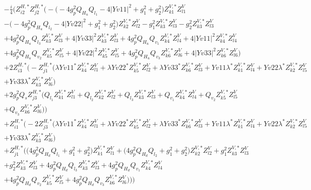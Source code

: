 \begin{align} 
 &-\frac{i}{4} \Big(Z^{H,*}_{i 2} Z^{H,*}_{j 2} \Big(- \Big(-4 g_{p}^{2} Q_{H_u} Q_{l_1}  -4 |Yv11|^2  + g_{1}^{2} + g_{2}^{2}\Big)Z^{V,*}_{k 1} Z_{{l 1}}^{V} \nonumber \\ 
 &- \Big(-4 g_{p}^{2} Q_{H_u} Q_{l_2}  -4 |Yv22|^2  + g_{1}^{2} + g_{2}^{2}\Big)Z^{V,*}_{k 2} Z_{{l 2}}^{V} - g_{1}^{2} Z^{V,*}_{k 3} Z_{{l 3}}^{V} - g_{2}^{2} Z^{V,*}_{k 3} Z_{{l 3}}^{V} \nonumber \\ 
 &+4 g_{p}^{2} Q_{H_u} Q_{l_3} Z^{V,*}_{k 3} Z_{{l 3}}^{V} +4 |Yv33|^2 Z^{V,*}_{k 3} Z_{{l 3}}^{V} +4 g_{p}^{2} Q_{H_u} Q_{v_1} Z^{V,*}_{k 4} Z_{{l 4}}^{V} +4 |Yv11|^2 Z^{V,*}_{k 4} Z_{{l 4}}^{V} \nonumber \\ 
 &+4 g_{p}^{2} Q_{H_u} Q_{v_2} Z^{V,*}_{k 5} Z_{{l 5}}^{V} +4 |Yv22|^2 Z^{V,*}_{k 5} Z_{{l 5}}^{V} +4 g_{p}^{2} Q_{H_u} Q_{v_3} Z^{V,*}_{k 6} Z_{{l 6}}^{V} +4 |Yv33|^2 Z^{V,*}_{k 6} Z_{{l 6}}^{V} \Big)\nonumber \\ 
 &+2 Z^{H,*}_{i 3} \Big(- Z^{H,*}_{j 1} \Big(\lambda Yv11^* Z^{V,*}_{k 4} Z_{{l 1}}^{V} +\lambda Yv22^* Z^{V,*}_{k 5} Z_{{l 2}}^{V} +\lambda Yv33^* Z^{V,*}_{k 6} Z_{{l 3}}^{V} +Yv11 \lambda^* Z^{V,*}_{k 1} Z_{{l 4}}^{V} +Yv22 \lambda^* Z^{V,*}_{k 2} Z_{{l 5}}^{V} \nonumber \\ 
 &+Yv33 \lambda^* Z^{V,*}_{k 3} Z_{{l 6}}^{V} \Big)\nonumber \\ 
 &+2 g_{p}^{2} Q_s Z^{H,*}_{j 3} \Big(Q_{l_1} Z^{V,*}_{k 1} Z_{{l 1}}^{V} +Q_{l_2} Z^{V,*}_{k 2} Z_{{l 2}}^{V} +Q_{l_3} Z^{V,*}_{k 3} Z_{{l 3}}^{V} +Q_{v_1} Z^{V,*}_{k 4} Z_{{l 4}}^{V} +Q_{v_2} Z^{V,*}_{k 5} Z_{{l 5}}^{V} \nonumber \\ 
 &+Q_{v_3} Z^{V,*}_{k 6} Z_{{l 6}}^{V} \Big)\Big)\nonumber \\ 
 &+Z^{H,*}_{i 1} \Big(-2 Z^{H,*}_{j 3} \Big(\lambda Yv11^* Z^{V,*}_{k 4} Z_{{l 1}}^{V} +\lambda Yv22^* Z^{V,*}_{k 5} Z_{{l 2}}^{V} +\lambda Yv33^* Z^{V,*}_{k 6} Z_{{l 3}}^{V} +Yv11 \lambda^* Z^{V,*}_{k 1} Z_{{l 4}}^{V} +Yv22 \lambda^* Z^{V,*}_{k 2} Z_{{l 5}}^{V} \nonumber \\ 
 &+Yv33 \lambda^* Z^{V,*}_{k 3} Z_{{l 6}}^{V} \Big)\nonumber \\ 
 &+Z^{H,*}_{j 1} \Big(\Big(4 g_{p}^{2} Q_{H_d} Q_{l_1}  + g_{1}^{2} + g_{2}^{2}\Big)Z^{V,*}_{k 1} Z_{{l 1}}^{V} +\Big(4 g_{p}^{2} Q_{H_d} Q_{l_2}  + g_{1}^{2} + g_{2}^{2}\Big)Z^{V,*}_{k 2} Z_{{l 2}}^{V} +g_{1}^{2} Z^{V,*}_{k 3} Z_{{l 3}}^{V} \nonumber \\ 
 &+g_{2}^{2} Z^{V,*}_{k 3} Z_{{l 3}}^{V} +4 g_{p}^{2} Q_{H_d} Q_{l_3} Z^{V,*}_{k 3} Z_{{l 3}}^{V} +4 g_{p}^{2} Q_{H_d} Q_{v_1} Z^{V,*}_{k 4} Z_{{l 4}}^{V} \nonumber \\ 
 &+4 g_{p}^{2} Q_{H_d} Q_{v_2} Z^{V,*}_{k 5} Z_{{l 5}}^{V} +4 g_{p}^{2} Q_{H_d} Q_{v_3} Z^{V,*}_{k 6} Z_{{l 6}}^{V} \Big)\Big)\Big)\end{align} 
